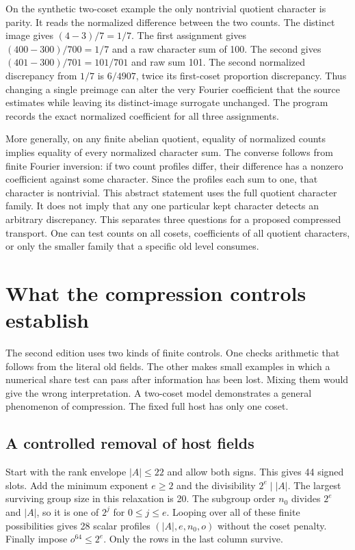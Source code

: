 \documentclass[12pt,letterpaper]{article}
\begin{document}
On the synthetic two-coset example the only nontrivial quotient character is parity. It reads the normalized difference between the two counts. The distinct image gives $(4-3)/7=1/7$. The first assignment gives $(400-300)/700=1/7$ and a raw character sum of 100. The second gives $(401-300)/701=101/701$ and raw sum 101. The second normalized discrepancy from $1/7$ is $6/4907$, twice its first-coset proportion discrepancy. Thus changing a single preimage can alter the very Fourier coefficient that the source estimates while leaving its distinct-image surrogate unchanged. The program records the exact normalized coefficient for all three assignments.

More generally, on any finite abelian quotient, equality of normalized counts implies equality of every normalized character sum. The converse follows from finite Fourier inversion: if two count profiles differ, their difference has a nonzero coefficient against some character. Since the profiles each sum to one, that character is nontrivial. This abstract statement uses the full quotient character family. It does not imply that any one particular kept character detects an arbitrary discrepancy. This separates three questions for a proposed compressed transport. One can test counts on all cosets, coefficients of all quotient characters, or only the smaller family that a specific old level consumes.


\section{What the compression controls establish}\label{sec:controls}
The second edition uses two kinds of finite controls. One checks arithmetic that follows from the literal old fields. The other makes small examples in which a numerical share test can pass after information has been lost. Mixing them would give the wrong interpretation. A two-coset model demonstrates a general phenomenon of compression. The fixed full host has only one coset.

\subsection{A controlled removal of host fields}
Start with the rank envelope $|A|\le22$ and allow both signs. This gives 44 signed slots. Add the minimum exponent $e\ge2$ and the divisibility $2^e\mid|A|$. The largest surviving group size in this relaxation is 20. The subgroup order $n_0$ divides $2^e$ and $|A|$, so it is one of $2^j$ for $0\le j\le e$. Looping over all of these finite possibilities gives 28 scalar profiles $(|A|,e,n_0,o)$ without the coset penalty. Finally impose $o^{64}\le2^e$. Only the rows in the last column survive.
\end{document}
